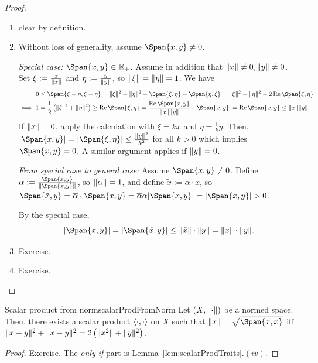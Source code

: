 \documentclass[language=english]{../../Template/TemplateLecture}
\begin{document}
\begin{proof}
    \begin{enumerate}[$(i)$]
        \item clear by definition.
        \item Without loss of generality, assume $\Span{x,y} \neq 0$. 
        
        \emph{Special case:} $\Span{x,y} \in \IR_+$. Assume in addition that $\lVert x\rVert \neq 0, \lVert y\rVert \neq 0$. Set $\xi := \frac{x}{\lVert x\rVert}$ and $\eta := \frac{y}{\lVert y\rVert}$, so $\lVert\xi\rVert = \lVert\eta\rVert = 1$. We have
        \begin{equation}
            \begin{split}
                0 &\leq \Span{\xi - \eta, \xi - \eta} = \norm{\xi}^2 + \norm{\eta}^2 - \Span{\xi,\eta} - \Span{\eta,\xi} = \norm{\xi}^2 + \norm{\eta}^2 - 2\Rea\Span{\xi,\eta} \\
                \iff 1 &= \frac{1}{2}\left(\norm{\xi}^2 + \norm{\eta}^2\right) \geq \Rea\Span{\xi,\eta} = \frac{\Rea\Span{x,y}}{\norm{x}\norm{y}} \cdot \abs{\Span{x,y}} = \Rea\Span{x,y} \leq \norm{x}\norm{y}.
            \end{split}
        \end{equation}
        If $\lVert x\rVert = 0$, apply the calculation with $\xi = kx$ and $\eta = \frac{1}{k}y$. Then, $\abs{\Span{x,y}} = \abs{\Span{\xi,\eta}}\leq \frac{\norm{y}^2}{k^2}$ for all $k > 0$ which implies $\Span{x,y} = 0$. A similar argument applies if $\lVert y\rVert = 0$.

        \emph{From special case to general case:} Assume $\Span{x,y} \neq 0$. Define $\alpha := \frac{\Span{x,y}}{\norm{\Span{x,y}}}$, so $\lVert\alpha\rVert = 1$, and define $\tilde{x} := \overline{\alpha} \cdot x$, so $\Span{\tilde{x},y} = \overline{\alpha} \cdot \Span{x,y} = \overline{\alpha} \alpha \abs{\Span{x,y}} = \abs{\Span{x,y}} > 0$.

        By the special case,
        \begin{equation}
            \abs{\Span{x,y}} = \abs{\Span{\tilde{x},y}} \leq \norm{\tilde{x}} \cdot \norm{y} = \norm{x} \cdot \norm{y}.
        \end{equation}
        \item Exercise.
        \item Exercise.
    \end{enumerate}
\end{proof}

\begin{lem}{Scalar product from norm}{scalarProdFromNorm}
    Let $(X, \lVert\cdot\rVert)$ be a normed space. Then, there exists a scalar product $\langle\cdot,\cdot\rangle$ on $X$ such that $\norm{x} = \sqrt{\Span{x,x}}$ iff $\lVert x+y\rVert^2 + \lVert x-y\rVert^2 = 2\left(\lVert x^2\rVert+\lVert y\rVert^2\right)$.
\end{lem}
\begin{proof}
    Exercise. The \emph{only if} part is Lemma~\ref{lem:scalarProdTraits}.$(iv)$.
\end{proof}
\end{document}
